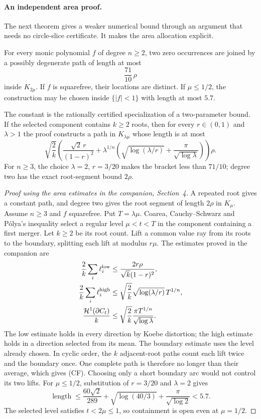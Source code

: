 \documentclass[11pt]{article}
\begin{document}
\paragraph{An independent area proof.}
The next theorem gives a weaker numerical bound through an argument that
needs no circle-slice certificate.  It makes the area allocation explicit.

\begin{theorem}
\label{res:constant-factor-path}
For every monic polynomial $f$ of degree $n\ge2$, two zero occurrences are
joined by a possibly degenerate path of length at most
\[
 \frac{71}{10}\,\rho
\]
inside $K_{2\mu}$.  If $f$ is squarefree, their locations are distinct.
If $\mu\le1/2$, the construction may be chosen inside $\{|f|<1\}$ with
length at most $5.7$.
\end{theorem}

The constant is the rationally certified specialization of a two-parameter
bound.  If the selected component contains $k\ge2$ roots, then for
every $r\in(0,1)$ and $\lambda>1$ the proof constructs a path in
$K_{\lambda\mu}$ whose length is at most
\[
 \sqrt{\frac2k}\left(
   \frac{\sqrt2\,r}{(1-r)^2}
   +\lambda^{1/n}\left(
      \sqrt{\log(\lambda/r)}+
      \frac{\pi}{\sqrt{\log\lambda}}
    \right)
 \right)\rho.                                      \tag{CF}
\]
For $n\ge3$, the choice $\lambda=2$, $r=3/20$ makes the bracket less
than $71/10$; degree two has the exact root-segment bound $2\rho$.

\begin{proof}[Proof using the area estimates in the companion, Section~4]
A repeated root gives a constant path, and degree two gives the root
segment of length $2\rho$ in $K_\mu$. Assume $n\ge3$ and $f$ squarefree.
Put $T=\lambda\mu$. Coarea, Cauchy--Schwarz and P\'olya's inequality
\cite[Theorem~1]{crane} select a regular level $\mu<t<T$ in the
component containing a first merger. Let $k\ge2$ be its root count.
Lift a common value ray from its roots to the boundary, splitting each
lift at modulus $r\mu$. The estimates proved in the companion are
\[
\begin{aligned}
 \frac2k\sum_i\ell_i^{\rm low}
 &\le\frac{2r\rho}{\sqrt{k}(1-r)^2},\\
 \frac2k\sum_i\ell_i^{\rm high}
 &\le\sqrt{\frac2k}\sqrt{\log(\lambda/r)}\,T^{1/n},\\
 \frac{\mathcal H^1(\partial C_t)}k
 &\le\sqrt{\frac2k}\frac{\pi T^{1/n}}{\sqrt{\log\lambda}}.
\end{aligned}
\]
The low estimate holds in every direction by Koebe distortion; the high
estimate holds in a direction selected from its mean. The boundary
estimate uses the level already chosen. In cyclic order, the $k$
adjacent-root paths count each lift twice and the boundary once. One
complete path is therefore no longer than their average, which gives
(CF). Choosing only a short boundary arc would not control its two lifts.
For $\mu\le1/2$, substitution of $r=3/20$ and $\lambda=2$ gives
\[
 \operatorname{length}\le
 \frac{60\sqrt2}{289}+\sqrt{\log(40/3)}
 +\frac{\pi}{\sqrt{\log2}}<5.7.
\]
The selected level satisfies $t<2\mu\le1$, so containment is open even
at $\mu=1/2$.
\end{proof}
\end{document}
